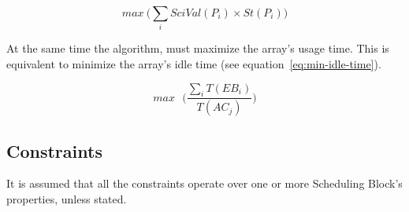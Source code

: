 \begin{equation}
\label{eq:max-sci-value}
max \: \bigg(\sum_{i} SciVal(P_i) \times St(P_i)\bigg)
\end{equation}

At the same time the algorithm, must maximize the array's usage time. This is equivalent to minimize the array's idle time (see equation~\ref{eq:min-idle-time}).

\begin{equation}
\label{eq:min-idle-time}
max \mbox{ }\Bigg( \frac{\sum_{i}T(EB_i)}{T(AC_j)}\Bigg)
\end{equation}


\subsection{Constraints}
\label{sec:sched-constraints}
It is assumed that all the constraints operate over one or more Scheduling Block's properties, unless stated.

